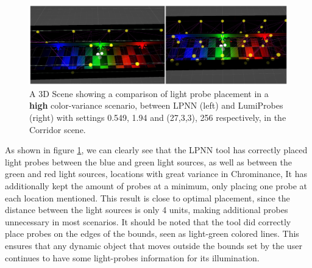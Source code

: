 \begin{figure}[h]
	\centering
	\includegraphics[scale=0.18]{Graphics/results/concats/comparison1.png}
	\caption{A 3D Scene showing a comparison of light probe placement in a \textbf{high} color-variance scenario, between LPNN (left) and LumiProbes (right) with settings 0.549, 1.94 and (27,3,3), 256 respectively, in the Corridor scene.}
	\label{fig:comp1}
\end{figure}

As shown in figure \ref{fig:comp1}, we can clearly see that the LPNN tool has correctly placed light probes between the blue and green light sources, as well as between the green and red light sources, locations with great variance in Chrominance, It has additionally kept the amount of probes at a minimum, only placing one probe at each location mentioned. This result is close to optimal placement, since the distance between the light sources is only 4 units, making additional probes unnecessary in most scenarios. It should be noted that the tool did correctly place probes on the edges of the bounds, seen as light-green colored lines. This ensures that any dynamic object that moves outside the bounds set by the user continues to have some light-probes information for its illumination. 

